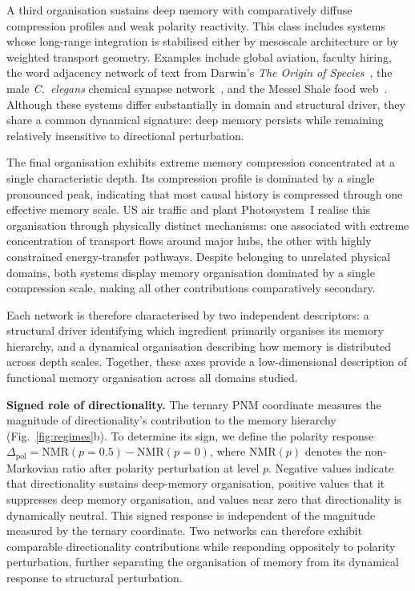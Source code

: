 \documentclass[aps,superscriptaddress,11pt]{revtex4-2}
\newcommand{\NMR}{\mathrm{NMR}}
\theoremstyle{definition}
\theoremstyle{plain}
\begin{document}
A third organisation sustains deep memory with comparatively diffuse
compression profiles and weak polarity reactivity. This class includes
systems whose long-range integration is stabilised either by mesoscale
architecture or by weighted transport geometry. Examples include global
aviation, faculty hiring, the word adjacency network of text from Darwin's
\textit{The Origin of Species}~\cite{Milo2004}, the male
\textit{C.~elegans} chemical synapse network~\cite{Cook2019}, and
the Messel Shale food web~\cite{Dunne2014}. Although these systems differ
substantially in domain and structural driver, they share a common
dynamical signature: deep memory persists while remaining relatively
insensitive to directional perturbation.

The final organisation exhibits extreme memory compression concentrated at
a single characteristic depth. Its compression profile is dominated by a
single pronounced peak, indicating that most causal history is compressed
through one effective memory scale. US air traffic and plant
Photosystem~I realise this organisation through physically distinct
mechanisms: one associated with extreme concentration of transport flows
around major hubs, the other with highly constrained energy-transfer
pathways. Despite belonging to unrelated physical domains, both systems
display memory organisation dominated by a single compression scale,
making all other contributions comparatively secondary.

Each network is therefore characterised by two independent descriptors: a
structural driver identifying which ingredient primarily organises its
memory hierarchy, and a dynamical organisation describing how memory is
distributed across depth scales. Together, these axes provide a
low-dimensional description of functional memory organisation across all
domains studied.

\medskip
\noindent
\textbf{Signed role of directionality.}
The ternary PNM coordinate measures the magnitude of directionality's
contribution to the memory hierarchy (Fig.~\ref{fig:regimes}b). To determine its sign, we define the
polarity response $\Delta_{\mathrm{pol}} = \NMR(p{=}0.5) - \NMR(p{=}0)$,
where $\NMR(p)$ denotes the non-Markovian ratio after polarity perturbation
at level $p$. Negative values indicate that directionality sustains
deep-memory organisation, positive values that it suppresses deep memory organisation,
and values near zero that directionality is dynamically neutral. This signed
response is independent of the magnitude measured by the ternary coordinate. 
Two networks can therefore exhibit comparable directionality contributions
while responding oppositely to polarity perturbation, further separating
the organisation of memory from its dynamical response to structural
perturbation.
\end{document}
